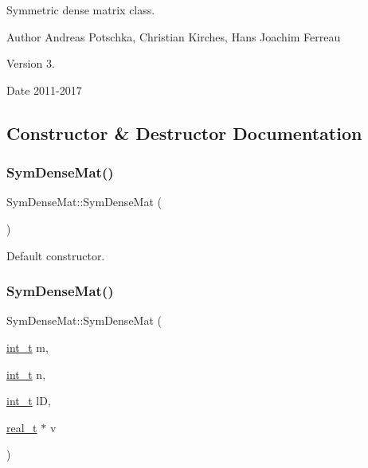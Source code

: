Symmetric dense matrix class.

\begin{DoxyAuthor}{Author}
Andreas Potschka, Christian Kirches, Hans Joachim Ferreau 
\end{DoxyAuthor}
\begin{DoxyVersion}{Version}
3. 
\end{DoxyVersion}
\begin{DoxyDate}{Date}
2011-\/2017 
\end{DoxyDate}


\subsection{Constructor \& Destructor Documentation}
\mbox{\label{class_sym_dense_mat_a6e733eae71c243aeca8218216235cc6a}} 
\subsubsection{\texorpdfstring{Sym\+Dense\+Mat()}{SymDenseMat()}\hspace{0.1cm}{\footnotesize\ttfamily [1/2]}}
{\footnotesize\ttfamily Sym\+Dense\+Mat\+::\+Sym\+Dense\+Mat (\begin{DoxyParamCaption}{ }\end{DoxyParamCaption})\hspace{0.3cm}{\ttfamily [inline]}}

Default constructor. \mbox{\label{class_sym_dense_mat_a158c75695d197782ef488cda8dbcd2fb}} 
\subsubsection{\texorpdfstring{Sym\+Dense\+Mat()}{SymDenseMat()}\hspace{0.1cm}{\footnotesize\ttfamily [2/2]}}
{\footnotesize\ttfamily Sym\+Dense\+Mat\+::\+Sym\+Dense\+Mat (\begin{DoxyParamCaption}\item[{\hyperlink{_types_8hpp_ab6fd6105e64ed14a0c9281326f05e623}{int\+\_\+t}}]{m,  }\item[{\hyperlink{_types_8hpp_ab6fd6105e64ed14a0c9281326f05e623}{int\+\_\+t}}]{n,  }\item[{\hyperlink{_types_8hpp_ab6fd6105e64ed14a0c9281326f05e623}{int\+\_\+t}}]{lD,  }\item[{\hyperlink{qp_o_a_s_e_s__wrapper_8h_a0d00e2b3dfadee81331bbb39068570c4}{real\+\_\+t} $\ast$}]{v }\end{DoxyParamCaption})\hspace{0.3cm}{\ttfamily [inline]}}

